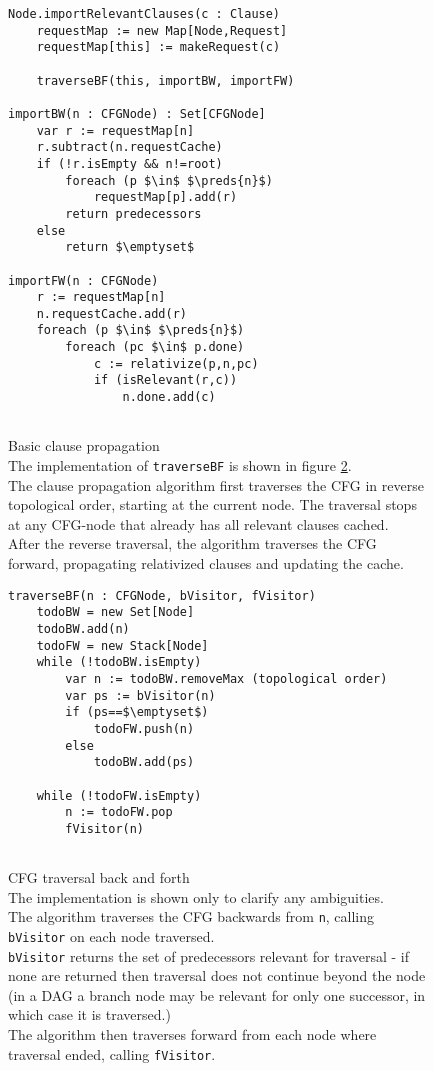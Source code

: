 \begin{figure}
\begin{lstlisting}
Node.importRelevantClauses(c : Clause)
	requestMap := new Map[Node,Request]
	requestMap[this] := makeRequest(c)
		
	traverseBF(this, importBW, importFW)

importBW(n : CFGNode) : Set[CFGNode]
	var r := requestMap[n]
	r.subtract(n.requestCache)
	if (!r.isEmpty && n!=root)
		foreach (p $\in$ $\preds{n}$)
			requestMap[p].add(r)
		return predecessors
	else
		return $\emptyset$

importFW(n : CFGNode)
	r := requestMap[n]
	n.requestCache.add(r)
	foreach (p $\in$ $\preds{n}$)
		foreach (pc $\in$ p.done)
			c := relativize(p,n,pc)
			if (isRelevant(r,c))
				n.done.add(c)
					
\end{lstlisting}
\caption{Basic clause propagation\\
The implementation of \lstinline|traverseBF| is shown in figure \ref{fig_traverseBF}.\\
The clause propagation algorithm first traverses the CFG in reverse topological order, 
starting at the current node. The traversal stops at any CFG-node that already has all relevant clauses cached.\\
After the reverse traversal, the algorithm traverses the CFG forward, propagating relativized clauses 
and updating the cache.
}
\label{clause_import_global}
\end{figure}

\begin{figure}
\begin{lstlisting}
traverseBF(n : CFGNode, bVisitor, fVisitor)
	todoBW = new Set[Node]
	todoBW.add(n)
	todoFW = new Stack[Node]
	while (!todoBW.isEmpty)
		var n := todoBW.removeMax (topological order)
		var ps := bVisitor(n)
		if (ps==$\emptyset$)
			todoFW.push(n)
		else
			todoBW.add(ps)

	while (!todoFW.isEmpty)
		n := todoFW.pop
		fVisitor(n)
			
\end{lstlisting}
\caption{CFG traversal back and forth\\
The implementation is shown only to clarify any ambiguities.\\
The algorithm traverses the CFG backwards from \lstinline|n|, calling \lstinline|bVisitor| on each node traversed.\\
\lstinline|bVisitor| returns the set of predecessors relevant for traversal - if none are returned then traversal does not continue beyond the node (in a DAG a branch node may be relevant for only one successor, in which case it is traversed.)\\
The algorithm then traverses forward from each node where traversal ended, calling \lstinline|fVisitor|.
}
\label{fig_traverseBF}
\end{figure}


